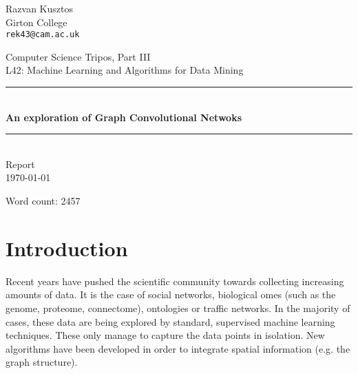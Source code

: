 \documentclass[10pt,a4]{article}
\begin{document}
    
    
    \thispagestyle{empty}
    
    \newcommand{\HRulee}{\rule{\linewidth}{0.5mm}}
    
    \vfil
    
    {\raggedleft \large Razvan Kusztos \\}
    {\raggedleft \large Girton College \\}
    {\raggedleft \large \tt rek43@cam.ac.uk \\}
    
    \vspace{50pt}
    
    \begin{center}
    
        {\Large \sc Computer Science Tripos, Part III \\}
        \vspace{10pt}
        {\Large \sc L42: Machine Learning and Algorithms for Data Mining\\}
        \vspace{20pt}
        \HRulee \\[0.1cm]
        \vspace{10pt}
        {\LARGE \bf An exploration of Graph Convolutional Netwoks}
        \HRulee \\[20pt]
        {\LARGE  Report\\}
        \vspace{20pt}
        {\Large \today \\}
        \vspace{40pt}
    \end{center}
    
    \vfill
    
    \begin{flushright}
    Word count: 2457
    \end{flushright}
        
    \newpage
    
    \section{Introduction}
    
    Recent years have pushed the scientific community towards collecting increasing 
    amounts of data. It is the case of social networks, biological omes (such as 
    the genome, proteome, connectome), ontologies or traffic networks. 
    In the majority of cases, these data are being explored by standard, 
    supervised machine learning techniques. These only manage to capture the 
    data points in isolation. New algorithms have been developed in order to 
    integrate spatial information (e.g. the graph structure).
    
\end{document}
